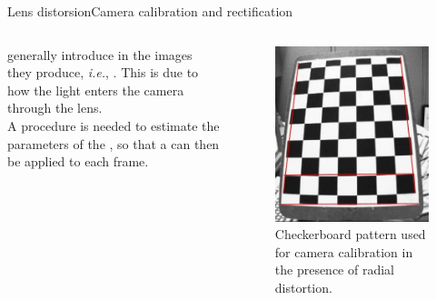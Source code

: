 \begin{frame}{Lens distorsion}{Camera calibration and rectification}
	\begin{columns}
		 generally introduce  in the images they produce, \emph{i.e.}, . This is due to how the light enters the camera through the lens.\\
		\bigskip
		A  procedure is needed to estimate the parameters of the , so that a  can then be applied to each frame.

		\begin{figure}
			\centering
			\includegraphics[width=.6\textwidth]{radial}
			\caption{Checkerboard pattern used for camera calibration in the presence of radial distortion.}
			\label{fig:radial}
		\end{figure}
	\end{columns}
\end{frame}

